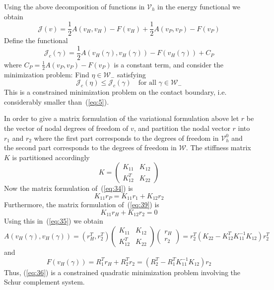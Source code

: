 \documentclass[12pt,a4paper]{article}
\numberwithin{equation}{section}
\numberwithin{table}{section}
\numberwithin{figure}{section}
\newcommand{\W}{\ensuremath{\mathcal{W}}}
\newcommand{\J}{\ensuremath{\mathcal{J}}}
\newcommand{\half}{\ensuremath{\frac{1}{2}}}
\newcommand{\Vh}{{\mathcal V}_h}
\newcommand{\qforall}{\quad\text{for all }}
\begin{document}
Using the above decomposition of functions in $\Vh$ in the energy functional we obtain
\begin{equation}
  \label{eq:35}
  \J(v) = \half A(v_H, v_H) - F(v_H)
  + \half A(v_P, v_P) - F(v_P)
\end{equation}
Define the functional
\begin{equation}
  \label{eq:46}
  \J_c(\gamma) = \half A(v_H(\gamma), v_H(\gamma)) - F(v_H(\gamma)) + C_P
\end{equation}
where $C_P = \half A(v_P, v_P) - F(v_P)$ is a constant term, and consider the minimization
problem: Find $\eta\in\W_{-}$ satisfying
\begin{equation}
  \label{eq:36}
  \J_c(\eta) \le \J_c(\gamma) \qforall \gamma\in\W_{-}
\end{equation}
This is a constrained minimization problem on the contact boundary, i.e. considerably
smaller than~(\ref{eq:5}).

In order to give a matrix formulation of the variational formulation above let $r$ be the
vector of nodal degrees of freedom of $v$, and partition the nodal vector $r$ into $r_1$
and $r_2$ where the first part corresponds to the degrees of freedom in $\Vh^0$ and the
second part corresponds to the degrees of freedom in $\W$.  The stiffness matrix $K$ is
partitioned accordingly
\begin{equation}
  \label{eq:37}
  K = 
  \begin{pmatrix}
    K_{11} & K_{12} \\ K_{12}^T & K_{22}
  \end{pmatrix}
\end{equation}
Now the matrix formulation of~(\ref{eq:34}) is
\begin{equation}
  \label{eq:33}
  K_{11} r_P = K_{11} r_1 + K_{12} r_2
\end{equation}
Furthermore, the matrix formulation of~(\ref{eq:39}) is
\begin{equation}
  \label{eq:40}
  K_{11} r_H + K_{12} r_2 = 0
\end{equation}
Using this in~(\ref{eq:35}) we obtain
\begin{equation*}
  \label{eq:41}
  A(v_H(\gamma), v_H(\gamma)) = (r_H^T, r_2^T)
  \begin{pmatrix}
    K_{11} & K_{12} \\ K_{12}^T & K_{22}
  \end{pmatrix}
  \begin{pmatrix}
    r_H \\ r_2
  \end{pmatrix}
  = r_2^T ( K_{22} - K_{12}^T K_{11}^{-1} K_{12} ) r_2^T
\end{equation*}
and
\begin{equation*}
  F(v_H(\gamma)) = R_1^T r_H + R_2^T r_2 = (R_2^T - R_1^T K_{11}^{-1} K_{12} ) r_2
\end{equation*}
Thus, (\ref{eq:36}) is a constrained quadratic minimization problem involving the Schur
complement system.
\end{document}
